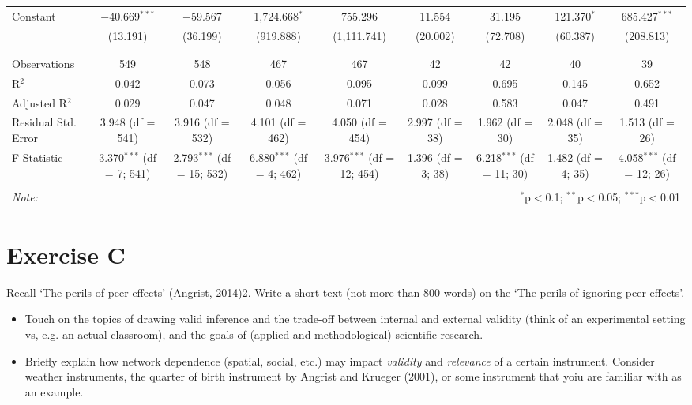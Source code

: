 \documentclass[
  a4paper,
]{article}
\begin{document}
\begin{table}[!htbp]
\begin{tabular}{@{\extracolsep{5pt}}lcccccccc}
 Constant & $-$40.669$^{***}$ & $-$59.567 & 1,724.668$^{*}$ & 755.296 & 11.554 & 31.195 & 121.370$^{*}$ & 685.427$^{***}$ \\ 
  & (13.191) & (36.199) & (919.888) & (1,111.741) & (20.002) & (72.708) & (60.387) & (208.813) \\ 
  & & & & & & & & \\ 
\hline \\[-1.8ex] 
Observations & 549 & 548 & 467 & 467 & 42 & 42 & 40 & 39 \\ 
R$^{2}$ & 0.042 & 0.073 & 0.056 & 0.095 & 0.099 & 0.695 & 0.145 & 0.652 \\ 
Adjusted R$^{2}$ & 0.029 & 0.047 & 0.048 & 0.071 & 0.028 & 0.583 & 0.047 & 0.491 \\ 
Residual Std. Error & 3.948 (df = 541) & 3.916 (df = 532) & 4.101 (df = 462) & 4.050 (df = 454) & 2.997 (df = 38) & 1.962 (df = 30) & 2.048 (df = 35) & 1.513 (df = 26) \\ 
F Statistic & 3.370$^{***}$ (df = 7; 541) & 2.793$^{***}$ (df = 15; 532) & 6.880$^{***}$ (df = 4; 462) & 3.976$^{***}$ (df = 12; 454) & 1.396 (df = 3; 38) & 6.218$^{***}$ (df = 11; 30) & 1.482 (df = 4; 35) & 4.058$^{***}$ (df = 12; 26) \\ 
\hline 
\hline \\[-1.8ex] 
\textit{Note:}  & \multicolumn{8}{r}{$^{*}$p$<$0.1; $^{**}$p$<$0.05; $^{***}$p$<$0.01} \\ 
\end{tabular} 
\end{table}

\hypertarget{exercise-c}{%
\section{Exercise C}\label{exercise-c}}

Recall `The perils of peer effects' (Angrist, 2014)2. Write a short text
(not more than 800 words) on the `The perils of ignoring peer effects'.

\begin{itemize}
    \item Touch on the topics of drawing valid inference and the trade-off between internal and external validity (think of an experimental setting vs, e.g. an actual classroom), and the goals of (applied and methodological) scientific research.
    \item Briefly explain how network dependence (spatial, social, etc.) may impact \emph{validity} and \emph{relevance} of a certain instrument. Consider weather instruments, the quarter of birth instrument by Angrist and Krueger (2001), or some instrument that yoiu are familiar with as an example.\end{itemize}
\end{document}
